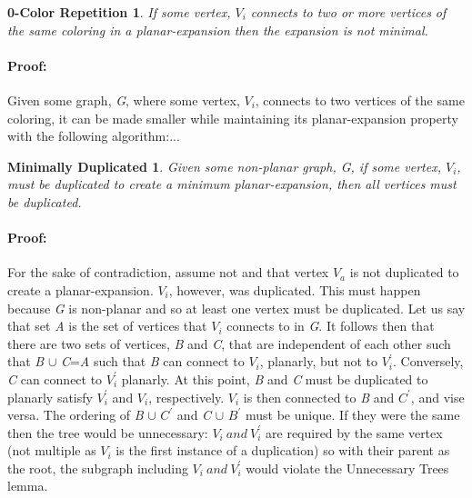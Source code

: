 \documentclass{article}
\newtheorem*{duplication}{Minimally Duplicated}
\newtheorem*{mincolor}{0-Color Repetition}
\begin{document}
\begin{mincolor}
If some vertex, $V_i$ connects to two or more vertices of the same coloring in a
planar-expansion then the expansion is not minimal.
\end{mincolor}
\paragraph{Proof: }
Given some graph, \emph{G}, where some vertex, $V_i$, connects 
to two vertices of the same coloring, it can be made smaller while maintaining 
its planar-expansion property with the following algorithm:...\\

\begin{duplication}
Given some non-planar graph, G, if some vertex, $V_i$, must be duplicated to 
create a minimum planar-expansion, then all vertices must be duplicated.
\end{duplication}
\paragraph{Proof: }
For the sake of contradiction, assume not and that 
vertex $V_a$ is not duplicated to create a planar-expansion. $V_i$, however, was
duplicated. This must happen because \emph{G} is non-planar and so at least one 
vertex must be duplicated. Let us say that set \emph{A} is the set of vertices 
that $V_i$ connects to in \emph{G}. It follows then that there are two sets of 
vertices, \emph{B} and \emph{C}, that are independent of each other such that 
\emph{B} $\cup$ \emph{C}=\emph{A} such that \emph{B} can connect to $V_i$,
 planarly, but not to $V^{'}_{i}$. Conversely, \emph{C} can connect to 
 $V^{'}_{i}$ planarly. At this point, \emph{B} and \emph{C} must be duplicated
 to planarly satisfy $V^{'}_i$ and $V_i$, respectively. $V_i$ is then 
 connected to \emph{B} and \emph{$C^{'}$}, and vise versa.  The ordering of
 \emph{B} $\cup$ \emph{$C^{'}$} and \emph{C} $\cup$ \emph{$B^{'}$}  must be 
 unique.  If they were the same then the tree would be unnecessary: $V_i\ and\ 
 V^{'}_{i}$ are required by the same vertex (not multiple as $V_i$ is the first
 instance of a duplication) so with their parent as the root, the subgraph
 including $V_i\ and\ V^{'}_{i}$ would violate the Unnecessary Trees lemma.
\end{document}
